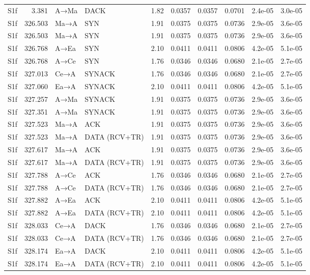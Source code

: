 \documentclass[10pt,letterpaper]{article}
\begin{document}
{\begin{longtable}{@{}lrllrrrrrr@{}}
S1f & 3.381 & A→Ma & DACK & 1.82 & 0.0357 & 0.0357 & 0.0701 & 2.4e-05 & 3.0e-05 \\
S1f & 326.503 & Ma→A & SYN & 1.91 & 0.0375 & 0.0375 & 0.0736 & 2.9e-05 & 3.6e-05 \\
S1f & 326.503 & Ma→A & SYN & 1.91 & 0.0375 & 0.0375 & 0.0736 & 2.9e-05 & 3.6e-05 \\
S1f & 326.768 & A→Ea & SYN & 2.10 & 0.0411 & 0.0411 & 0.0806 & 4.2e-05 & 5.1e-05 \\
S1f & 326.768 & A→Ce & SYN & 1.76 & 0.0346 & 0.0346 & 0.0680 & 2.1e-05 & 2.7e-05 \\
S1f & 327.013 & Ce→A & SYNACK & 1.76 & 0.0346 & 0.0346 & 0.0680 & 2.1e-05 & 2.7e-05 \\
S1f & 327.060 & Ea→A & SYNACK & 2.10 & 0.0411 & 0.0411 & 0.0806 & 4.2e-05 & 5.1e-05 \\
S1f & 327.257 & A→Ma & SYNACK & 1.91 & 0.0375 & 0.0375 & 0.0736 & 2.9e-05 & 3.6e-05 \\
S1f & 327.351 & A→Ma & SYNACK & 1.91 & 0.0375 & 0.0375 & 0.0736 & 2.9e-05 & 3.6e-05 \\
S1f & 327.523 & Ma→A & ACK & 1.91 & 0.0375 & 0.0375 & 0.0736 & 2.9e-05 & 3.6e-05 \\
S1f & 327.523 & Ma→A & DATA (RCV+TR) & 1.91 & 0.0375 & 0.0375 & 0.0736 & 2.9e-05 & 3.6e-05 \\
S1f & 327.617 & Ma→A & ACK & 1.91 & 0.0375 & 0.0375 & 0.0736 & 2.9e-05 & 3.6e-05 \\
S1f & 327.617 & Ma→A & DATA (RCV+TR) & 1.91 & 0.0375 & 0.0375 & 0.0736 & 2.9e-05 & 3.6e-05 \\
S1f & 327.788 & A→Ce & ACK & 1.76 & 0.0346 & 0.0346 & 0.0680 & 2.1e-05 & 2.7e-05 \\
S1f & 327.788 & A→Ce & DATA (RCV+TR) & 1.76 & 0.0346 & 0.0346 & 0.0680 & 2.1e-05 & 2.7e-05 \\
S1f & 327.882 & A→Ea & ACK & 2.10 & 0.0411 & 0.0411 & 0.0806 & 4.2e-05 & 5.1e-05 \\
S1f & 327.882 & A→Ea & DATA (RCV+TR) & 2.10 & 0.0411 & 0.0411 & 0.0806 & 4.2e-05 & 5.1e-05 \\
S1f & 328.033 & Ce→A & DACK & 1.76 & 0.0346 & 0.0346 & 0.0680 & 2.1e-05 & 2.7e-05 \\
S1f & 328.033 & Ce→A & DATA (RCV+TR) & 1.76 & 0.0346 & 0.0346 & 0.0680 & 2.1e-05 & 2.7e-05 \\
S1f & 328.174 & Ea→A & DACK & 2.10 & 0.0411 & 0.0411 & 0.0806 & 4.2e-05 & 5.1e-05 \\
S1f & 328.174 & Ea→A & DATA (RCV+TR) & 2.10 & 0.0411 & 0.0411 & 0.0806 & 4.2e-05 & 5.1e-05 \\

\end{longtable}}
\end{document}
